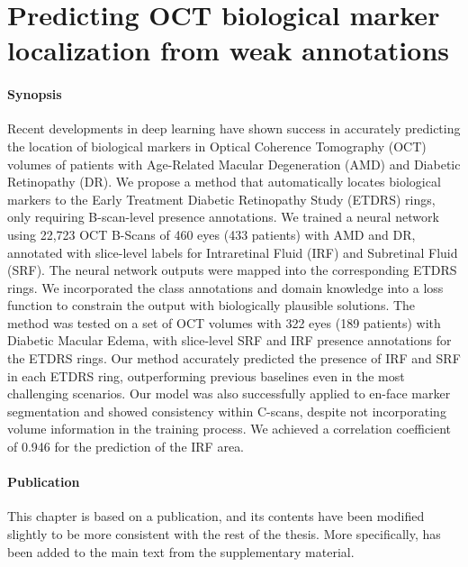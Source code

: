 \graphicspath{{ch6_oct_localization/}{Figures/}}

\chapter{Predicting OCT biological marker localization from weak annotations}
\label{chapter:oct}


\subsubsection{Synopsis}Recent developments in deep learning have shown success in accurately predicting the location of biological markers in Optical Coherence Tomography (OCT) volumes of patients with Age-Related Macular Degeneration (AMD) and Diabetic Retinopathy (DR). We propose a method that automatically locates biological markers to the Early Treatment Diabetic Retinopathy Study (ETDRS) rings, only requiring B-scan-level presence annotations. We trained a neural network using 22,723 OCT B-Scans of 460 eyes (433 patients) with AMD and DR, annotated with slice-level labels for Intraretinal Fluid (IRF) and Subretinal Fluid (SRF). The neural network outputs were mapped into the corresponding ETDRS rings. We incorporated the class annotations and domain knowledge into a loss function to constrain the output with biologically plausible solutions. The method was tested on a set of OCT volumes with 322 eyes (189 patients) with Diabetic Macular Edema, with slice-level SRF and IRF presence annotations for the ETDRS rings. Our method accurately predicted the presence of IRF and SRF in each ETDRS ring, outperforming previous baselines even in the most challenging scenarios. Our model was also successfully applied to en-face marker segmentation and showed consistency within C-scans, despite not incorporating volume information in the training process. We achieved a correlation coefficient of 0.946 for the prediction of the IRF area. 

\subsubsection{Publication}This chapter is based on a publication, and its contents have been modified slightly to be more consistent with the rest of the thesis. More specifically,  has been added to the main text from the supplementary material.

